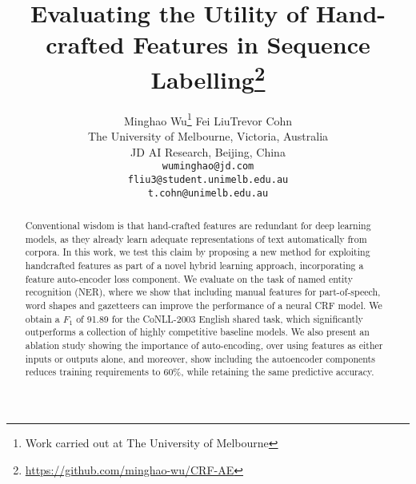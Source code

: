 \documentclass[11pt,a4paper]{article}
\title{Evaluating the Utility of Hand-crafted Features in Sequence Labelling\thanks{{} {} \url{https://github.com/minghao-wu/CRF-AE}}}
\author{Minghao Wu\affmark[$\spadesuit\heartsuit$]\thanks{{} {} Work carried out at The University of Melbourne} \qquad Fei Liu\affmark[$\spadesuit$] \qquad Trevor Cohn\affmark[$\spadesuit$]\\
         \affmark[$\spadesuit$]The University of Melbourne, Victoria, Australia\\
         \affmark[$\heartsuit$]JD AI Research, Beijing, China \\
         {\tt {wuminghao@jd.com}} \\ %
         {\tt {fliu3@student.unimelb.edu.au}}\\
         {\tt {t.cohn@unimelb.edu.au}}}
\date{}
\begin{document}
\maketitle
\begin{abstract}
Conventional wisdom is that hand-crafted features are redundant for deep learning models, as they already learn adequate representations of text automatically from corpora. 
In this work, we test this claim by proposing a new method for exploiting handcrafted features as part of a novel hybrid learning approach, incorporating a feature auto-encoder loss component. 
We evaluate  on the task of named entity recognition (NER), where we show that including manual features for part-of-speech, word shapes and gazetteers can improve the performance of a neural CRF model.
We obtain a $F_1$ of 91.89 for the CoNLL-2003 English shared task, which significantly outperforms a collection of highly competitive baseline models. 
We also present an ablation study showing the importance of auto-encoding, over using features as either inputs or outputs alone, and moreover, show including the autoencoder components reduces training requirements to 60\%, while retaining the same predictive accuracy.

\end{abstract}











\end{document}
